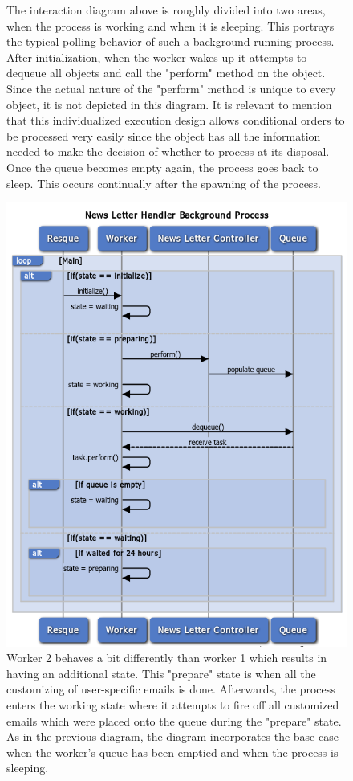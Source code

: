 \begin{figure}
\caption{The interaction diagram above is roughly divided into two areas, when the process is working and when it is sleeping. This portrays the typical polling behavior of such a background running process. After initialization, when the worker wakes up it attempts to dequeue all objects and call the "perform" method on the object. Since the actual nature of the "perform" method is unique to every object, it is not depicted in this diagram. It is relevant to mention that this individualized execution design allows conditional orders to be processed very easily since the object has all the information needed to make the decision of whether to process at its disposal. Once the queue becomes empty again, the process goes back to sleep. This occurs continually after the spawning of the process.}
\end{figure}

\begin{figure}
\centering
\includegraphics[width=5.5in]{./Diagrams/ComponentModels/stateMachineDiagrams/Worker2/worker2.png}
\caption{Worker 2 behaves a bit differently than worker 1 which results in having an additional state. This "prepare" state is when all the customizing of user-specific emails is done. Afterwards, the process enters the working state where it attempts to fire off all customized emails which were placed onto the queue during the "prepare" state. As in the previous diagram, the diagram incorporates the base case when the worker's queue has been emptied and when the process is sleeping.}
\end{figure}


